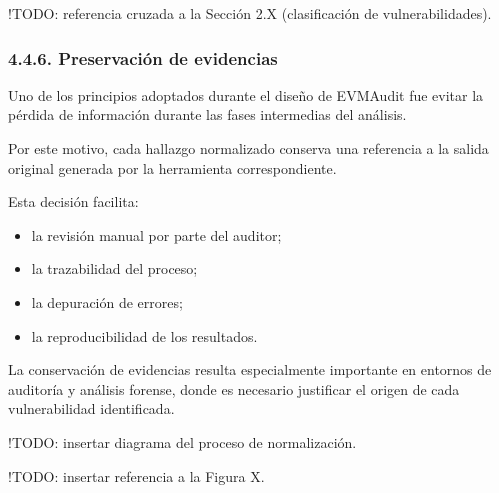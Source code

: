 !TODO: referencia cruzada a la Sección 2.X (clasificación de
vulnerabilidades).

\subsubsection{4.4.6. Preservación de
evidencias}\label{preservaciuxf3n-de-evidencias}

Uno de los principios adoptados durante el diseño de EVMAudit fue evitar
la pérdida de información durante las fases intermedias del análisis.

Por este motivo, cada hallazgo normalizado conserva una referencia a la
salida original generada por la herramienta correspondiente.

Esta decisión facilita:

\begin{itemize}
\tightlist
\item
  la revisión manual por parte del auditor;
\item
  la trazabilidad del proceso;
\item
  la depuración de errores;
\item
  la reproducibilidad de los resultados.
\end{itemize}

La conservación de evidencias resulta especialmente importante en
entornos de auditoría y análisis forense, donde es necesario justificar
el origen de cada vulnerabilidad identificada.

!TODO: insertar diagrama del proceso de normalización.

!TODO: insertar referencia a la Figura X.
